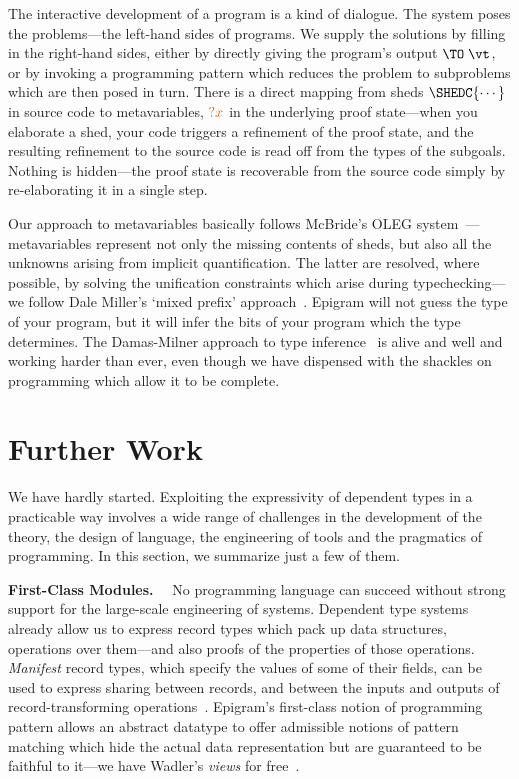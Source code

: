 \documentclass{fundam}
\begin{document}
The interactive development of a program is a kind of dialogue.  The
system poses the problems---the left-hand sides of programs.  We
supply the solutions by filling in the right-hand sides, either by
directly giving the program's output $\TO\;\vt$, or by invoking a
programming pattern which reduces the problem to subproblems which are
then posed in turn. There is a direct mapping from sheds
$\SHEDC{\cdots}$ in source code to metavariables, $\orange{?x}$ in the
underlying proof state---when you elaborate a shed, your code triggers
a refinement of the proof state, and the resulting refinement to the
source code is read off from the types of the subgoals. Nothing is
hidden---the proof state is recoverable from the source code simply by
re-elaborating it in a single step.

Our approach to metavariables basically follows McBride's OLEG
system~\cite{conor-phd}---metavariables represent not only the missing
contents of sheds, but also all the unknowns arising from implicit
quantification. The latter are resolved, where possible, by solving
the unification constraints which arise during typechecking---we
follow Dale Miller's `mixed prefix'
approach~\cite{miller:mixed}. Epigram will not guess the type of your
program, but it will infer the bits of your program which the type
determines. The Damas-Milner approach to type
inference~\cite{damas.milner:principal} is alive and well and working
harder than ever, even though we have dispensed with the shackles on
programming which allow it to be complete.


\section{Further Work}
\label{sec:further}

We have hardly started. Exploiting
the expressivity of dependent types in a practicable way involves
a wide range of challenges in the development of the theory, the
design of language, the engineering of tools and the pragmatics of
programming. In this section, we summarize just a few of them.

\textbf{First-Class Modules.}$\quad$ No programming language can succeed
without strong support for the large-scale engineering of
systems. Dependent type systems already allow us to express record
types which pack up data structures, operations over them---and also
proofs of the properties of those operations. \emph{Manifest} record
types, which specify the values of some of their fields, can be used
to express sharing between records, and between the inputs and
outputs of record-transforming operations~\cite{pollack:records}.
Epigram's first-class notion of programming pattern allows an abstract
datatype to offer admissible notions of pattern matching which hide
the actual data representation but are guaranteed to be faithful to
it---we have Wadler's \emph{views} for free~\cite{wadler:views}.
\end{document}
